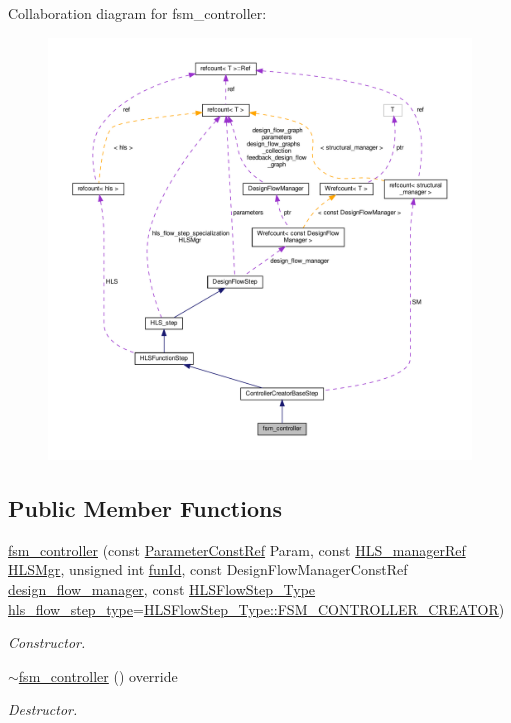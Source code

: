Collaboration diagram for fsm\+\_\+controller\+:
\nopagebreak
\begin{figure}[H]
\begin{center}
\leavevmode
\includegraphics[width=350pt]{d1/d2c/classfsm__controller__coll__graph}
\end{center}
\end{figure}
\subsection*{Public Member Functions}
\begin{DoxyCompactItemize}
\item 
\hyperlink{classfsm__controller_a3d9ecb2315c65086b2a52d4d0a30f2fc}{fsm\+\_\+controller} (const \hyperlink{Parameter_8hpp_a37841774a6fcb479b597fdf8955eb4ea}{Parameter\+Const\+Ref} Param, const \hyperlink{hls__manager_8hpp_acd3842b8589fe52c08fc0b2fcc813bfe}{H\+L\+S\+\_\+manager\+Ref} \hyperlink{classHLS__step_ade85003a99d34134418451ddc46a18e9}{H\+L\+S\+Mgr}, unsigned int \hyperlink{classHLSFunctionStep_a3e6434fd86c698b0c70520b859bff5b0}{fun\+Id}, const Design\+Flow\+Manager\+Const\+Ref \hyperlink{classDesignFlowStep_ab770677ddf087613add30024e16a5554}{design\+\_\+flow\+\_\+manager}, const \hyperlink{hls__step_8hpp_ada16bc22905016180e26fc7e39537f8d}{H\+L\+S\+Flow\+Step\+\_\+\+Type} \hyperlink{classHLS__step_aefd59af15346ec3f10bf12bd756e6777}{hls\+\_\+flow\+\_\+step\+\_\+type}=\hyperlink{hls__step_8hpp_ada16bc22905016180e26fc7e39537f8dafc3ad5cbed1c2ed2a879677fc5567cd9}{H\+L\+S\+Flow\+Step\+\_\+\+Type\+::\+F\+S\+M\+\_\+\+C\+O\+N\+T\+R\+O\+L\+L\+E\+R\+\_\+\+C\+R\+E\+A\+T\+OR})
\begin{DoxyCompactList}\small\item\em Constructor. \end{DoxyCompactList}\item 
\hyperlink{classfsm__controller_a034fb9431bbb26b2477720a27fb3d176}{$\sim$fsm\+\_\+controller} () override
\begin{DoxyCompactList}\small\item\em Destructor. \end{DoxyCompactList}\end{DoxyCompactItemize}
